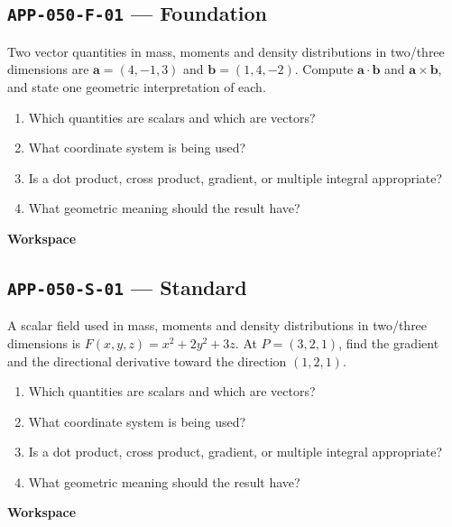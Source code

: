 \documentclass[11pt]{book}
\newcommand{\pid}[1]{\texttt{#1}}
\newcommand{\workspace}{\par\vspace{0.7in}\hrulefill\par\vspace{0.55in}\hrulefill\par}
\begin{document}
\subsection*{\pid{APP-050-F-01} — Foundation}
\begin{problembox}
Two vector quantities in mass, moments and density distributions in two/three dimensions are $\mathbf a=(4,-1,3)$ and $\mathbf b=(1,4,-2)$. Compute $\mathbf a\cdot\mathbf b$ and $\mathbf a\times\mathbf b$, and state one geometric interpretation of each.
\end{problembox}
\begin{promptbox}\begin{enumerate}
\item Which quantities are scalars and which are vectors?
\item What coordinate system is being used?
\item Is a dot product, cross product, gradient, or multiple integral appropriate?
\item What geometric meaning should the result have?
\end{enumerate}\end{promptbox}
\textbf{Workspace}\workspace
{}
\subsection*{\pid{APP-050-S-01} — Standard}
\begin{problembox}
A scalar field used in mass, moments and density distributions in two/three dimensions is $F(x,y,z)=x^2+2y^2+3z$. At $P=(3,2,1)$, find the gradient and the directional derivative toward the direction $(1,2,1)$.
\end{problembox}
\begin{promptbox}\begin{enumerate}
\item Which quantities are scalars and which are vectors?
\item What coordinate system is being used?
\item Is a dot product, cross product, gradient, or multiple integral appropriate?
\item What geometric meaning should the result have?
\end{enumerate}\end{promptbox}
\textbf{Workspace}\workspace
{}
\end{document}
